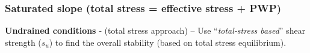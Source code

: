 \documentclass[notes]{beamer}
\begin{document}
\begin{frame}
\frametitle{Saturated slope (total stress = effective stress + PWP)}
\textbf{Undrained conditions} ‐ (total stress approach) – Use ``\textit{total‐stress based}''
shear strength ($s_u$) to find the overall stability (based on total stress
equilibrium).
\end{frame}
\end{document}
